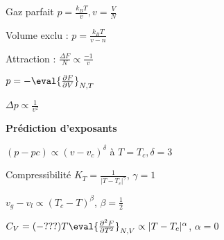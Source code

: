   \squishlist
   \item Gaz parfait $p=\frac{k_BT}{v}, v=\frac{V}{N}$
   \item Volume exclu : $p=\frac{k_BT}{v-n}$
   \item Attraction :  $ \frac{\Delta F}{N} \propto \frac{-1}{v}$
   \item $p=-\eval{\frac{\partial F}{\partial V}}_{N,T}$
   \item $\Delta p \propto \frac{1}{v^2}$
   \item[] \textbf{Prédiction d'exposants}
   \item $(p-pc)\propto (v-v_c)^\delta$ à $T=T_c, \boxed{\delta=3}$ 
   \item Compressibilité $K_T=\frac{1}{|T-T_c|^\gamma}$, $\boxed{\gamma=1}$
   \item $v_g - v_l \propto (T_c - T)^\beta$, $\boxed{\beta=\frac{1}{2}}$
   \item $C_V=(-???)T\eval{\frac{\partial^2 F}{\partial T^2}}_{N,V} \propto |T-T_c|^\alpha$, $\boxed{\alpha = 0}$
  \squishend